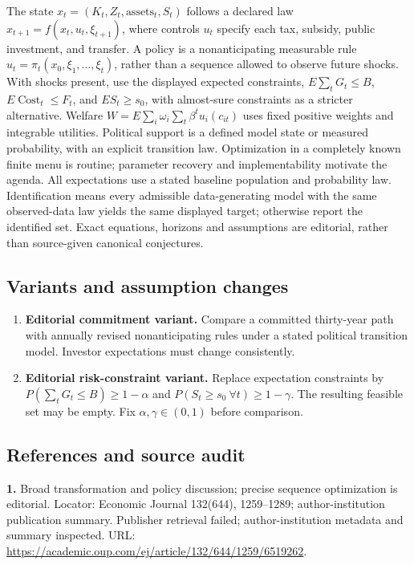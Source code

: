 \documentclass[11pt,a4paper]{article}
\begin{document}
The state \(x_t=(K_t,Z_t,\text{assets}_t,S_t)\) follows a declared law \(x_{t+1}=f(x_t,u_t,\xi_{t+1})\), where controls \(u_t\) specify each tax, subsidy, public investment, and transfer. A policy is a nonanticipating measurable rule \(u_t=\pi_t(x_0,\xi_1,\ldots,\xi_t)\), rather than a sequence allowed to observe future shocks. With shocks present, use the displayed expected constraints, \(E\sum_tG_t\leq B\), \(E\operatorname{Cost}_t\leq F_t\), and \(E S_t\geq s_0\), with almost-sure constraints as a stricter alternative. Welfare \(W=E\sum_i\omega_i\sum_t\beta^tu_i(c_{it})\) uses fixed positive weights and integrable utilities. Political support is a defined model state or measured probability, with an explicit transition law. Optimization in a completely known finite menu is routine; parameter recovery and implementability motivate the agenda. All expectations use a stated baseline population and probability law. Identification means every admissible data-generating model with the same observed-data law yields the same displayed target; otherwise report the identified set. Exact equations, horizons and assumptions are editorial, rather than source-given canonical conjectures.
\subsection*{Variants and assumption changes}
\begin{enumerate}
\item \textbf{Editorial commitment variant.} Compare a committed thirty-year path with annually revised nonanticipating rules under a stated political transition model. Investor expectations must change consistently.
\item \textbf{Editorial risk-constraint variant.} Replace expectation constraints by \(P(\sum_tG_t\leq B)\geq1-\alpha\) and \(P(S_t\geq s_0\ \forall t)\geq1-\gamma\). The resulting feasible set may be empty. Fix \(\alpha,\gamma\in(0,1)\) before comparison.
\end{enumerate}
\subsection*{References and source audit}
\textbf{1.} Broad transformation and policy discussion; precise sequence optimization is editorial. Locator: Economic Journal 132(644), 1259–1289; author-institution publication summary. Publisher retrieval failed; author-institution metadata and summary inspected. URL: \url{https://academic.oup.com/ej/article/132/644/1259/6519262}.
\end{document}
